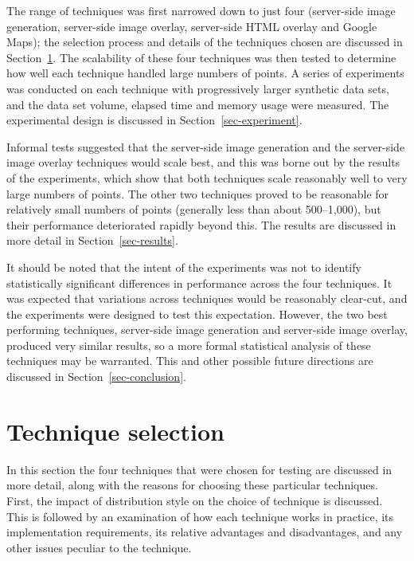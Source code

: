 \documentclass[acmnow]{acmtrans2m}
\begin{document}
The range of techniques was first narrowed down to just four
(server-side image generation, server-side image overlay, server-side
HTML overlay and Google Maps); the selection process and details of the
techniques chosen are discussed in Section~\ref{sec-techniques}. The
scalability of these four techniques was then tested to determine how
well each technique handled large numbers of points. A series of
experiments was conducted on each technique with progressively larger
synthetic data sets, and the data set volume, elapsed time and memory
usage were measured. The experimental design is discussed in
Section~\ref{sec-experiment}.

Informal tests suggested that the server-side image generation and the
server-side image overlay techniques would scale best, and this was
borne out by the results of the experiments, which show that both
techniques scale reasonably well to very large numbers of points. The
other two techniques proved to be reasonable for relatively small
numbers of points (generally less than about 500--1,000), but their
performance deteriorated rapidly beyond this. The results are discussed
in more detail in Section~\ref{sec-results}.

It should be noted that the intent of the experiments was not to
identify statistically significant differences in performance across the
four techniques. It was expected that variations across techniques would
be reasonably clear-cut, and the experiments were designed to test this
expectation. However, the two best performing techniques, server-side
image generation and server-side image overlay, produced very similar
results, so a more formal statistical analysis of these techniques may
be warranted. This and other possible future directions are discussed in
Section~\ref{sec-conclusion}.


\section{Technique selection}
\label{sec-techniques}

In this section the four techniques that were chosen for testing are
discussed in more detail, along with the reasons for choosing these
particular techniques. First, the impact of distribution style on the
choice of technique is discussed. This is followed by an examination of
how each technique works in practice, its implementation requirements,
its relative advantages and disadvantages, and any other issues peculiar
to the technique.
\end{document}
